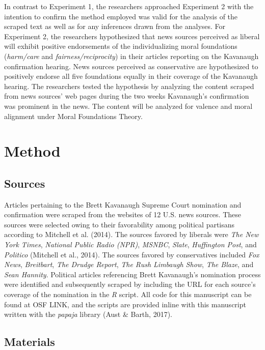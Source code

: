 \documentclass[,man]{apa6}
\begin{document}
In contrast to Experiment 1, the researchers approached Experiment 2 with the intention to confirm the method employed was valid for the analysis of the scraped text as well as for any inferences drawn from the analyses. For Experiment 2, the researchers hypothesized that news sources perceived as liberal will exhibit positive endorsements of the individualizing moral foundations (\emph{harm/care} and \emph{fairness/reciprocity}) in their articles reporting on the Kavanaugh confirmation hearing. News sources perceived as conservative are hypothesized to positively endorse all five foundations equally in their coverage of the Kavanaugh hearing. The researchers tested the hypothesis by analyzing the content scraped from news sources' web pages during the two weeks Kavanaugh's confirmation was prominent in the news. The content will be analyzed for valence and moral alignment under Moral Foundations Theory.

\hypertarget{method-1}{%
\section{Method}\label{method-1}}

\hypertarget{sources-1}{%
\subsection{Sources}\label{sources-1}}

Articles pertaining to the Brett Kavanaugh Supreme Court nomination and confirmation were scraped from the websites of 12 U.S. news sources. These sources were selected owing to their favorability among political partisans according to Mitchell et al. (2014). The sources favored by liberals were \emph{The New York Times}, \emph{National Public Radio (NPR)}, \emph{MSNBC}, \emph{Slate}, \emph{Huffington Post}, and \emph{Politico} (Mitchell et al., 2014). The sources favored by conservatives included \emph{Fox News}, \emph{Breitbart}, \emph{The Drudge Report}, \emph{The Rush Limbaugh Show}, \emph{The Blaze}, and \emph{Sean Hannity}. Political articles referencing Brett Kavanaugh's nomination process were identified and subsequently scraped by including the URL for each source's coverage of the nomination in the \emph{R} script. All code for this manuscript can be found at OSF LINK, and the scripts are provided inline with this manuscript written with the \emph{papaja} library (Aust \& Barth, 2017).

\hypertarget{materials-1}{%
\subsection{Materials}\label{materials-1}}
\end{document}
